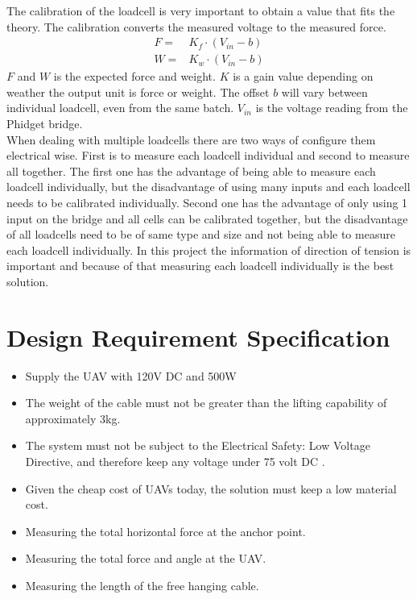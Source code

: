 The calibration of the loadcell is very important to obtain a value that fits the theory. The calibration converts the measured voltage to the measured force.
\begin{eqnarray}
F =& K_f \cdot (V_{in} - b)\\
W =& K_w \cdot (V_{in} - b)
\end{eqnarray}
$F$ and $W$ is the expected force and weight. $K$ is a gain value depending on weather the output unit is force or weight. The offset $b$ will vary between individual loadcell, even from the same batch. $V_{in}$ is the voltage reading from the Phidget bridge.\\
\noindent
When dealing with multiple loadcells there are two ways of configure them electrical wise. First is to measure each loadcell individual and second to measure all together. The first one has the advantage of being able to measure each loadcell individually, but the disadvantage of using many inputs and each loadcell needs to be calibrated individually. Second one has the advantage of only using 1 input on the bridge and all cells can be calibrated together, but the disadvantage of all loadcells need to be of same type and size and not being able to measure each loadcell individually. In this project the information of direction of tension is important and because of that measuring each loadcell individually is the best solution. \cite{PhidgetsInc.2012}


\section{Design Requirement Specification}
\begin{itemize}
\item Supply the UAV with 120V DC and 500W
\item The weight of the cable must not be greater than the lifting capability of approximately 3kg.
\item The system must not be subject to the Electrical Safety: Low Voltage Directive, and therefore keep any voltage under 75 volt DC \cite{Parliament2006}.
\item Given the cheap cost of UAVs today, the solution must keep a low material cost.
\item Measuring the total horizontal force at the anchor point.
\item Measuring the total force and angle at the UAV.
\item Measuring the length of the free hanging cable.
\end{itemize}





